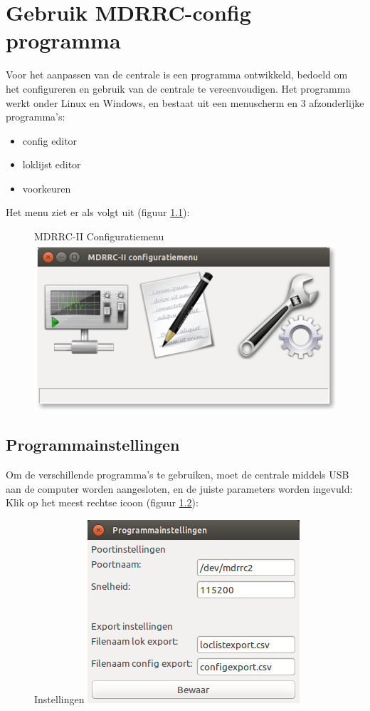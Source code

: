 \documentclass[12pt,a4paper]{report}
\begin{document}
\chapter{Gebruik MDRRC-config programma}
\label{ch:config}
Voor het aanpassen van de centrale is een programma ontwikkeld, bedoeld om het configureren en gebruik van de centrale te vereenvoudigen.
Het programma werkt onder Linux en Windows, en bestaat uit een menuscherm en 3 afzonderlijke programma's:
\begin{itemize}
\item config editor
\item loklijst editor
\item voorkeuren
\end{itemize}

Het menu ziet er als volgt uit (figuur \ref{scs:menu}):\\

\begin{figure}[ht]
  \captionbox
  {MDRRC-II Configuratiemenu\label{scs:menu}}
  {\includegraphics[scale=0.5]{images/rcu_screenshot1}\\}
\end{figure}

\section{Programmainstellingen}

Om de verschillende programma's te gebruiken, moet de centrale middels USB aan de computer worden aangesloten, en de juiste parameters worden ingevuld:
Klik op het meest rechtse icoon (figuur \ref{scs:settings}):

\begin{figure}[ht]
  \captionbox
  {Instellingen\label{scs:settings}}
  {\includegraphics[scale=0.5]{images/rcu_screenshot2}\\}
\end{figure}
\end{document}
